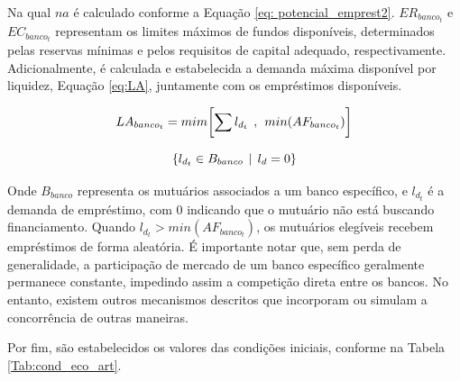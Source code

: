 \documentclass[hidelinks, article,12pt,oneside,a4paper,english,brazil,sumario=tradicional]{abntex2}
\begin{document}
Na qual $na$ é calculado conforme a Equação \ref{eq: potencial_emprest2}. $ER_{banco_{t}}$ e $EC_{banco_{t}}$ representam os limites máximos de fundos disponíveis, determinados pelas reservas mínimas e pelos requisitos de capital adequado, respectivamente. Adicionalmente, é calculada e estabelecida a demanda máxima disponível por liquidez, Equação \ref{eq:LA}, juntamente com os empréstimos disponíveis.

\begin{equation} \label{eq:LA}
 LA_{banco_{t}} = mim \biggl[ \sum l_{d_{t}} \hspace{1.5mm} , \hspace{1.5mm} min (AF_{banco_{t}})    \biggl]
\end{equation}

\begin{equation} \label{eq:LA2}
 \{ l_{d_{t}} \in B_{banco} \hspace{1.5mm} | \hspace{1.5mm} l_{d} = 0\}
\end{equation}

Onde $B_{banco}$ representa os mutuários associados a um banco específico, e $l_{d_{t}}$ é a demanda de empréstimo, com $0$ indicando que o mutuário não está buscando financiamento. Quando $l_{d_{t}} > min (AF_{banco_{t}})$, os mutuários elegíveis recebem empréstimos de forma aleatória. É importante notar que, sem perda de generalidade, a participação de mercado de um banco específico geralmente permanece constante, impedindo assim a competição direta entre os bancos. No entanto, existem outros mecanismos descritos que incorporam ou simulam a concorrência de outras maneiras.

Por fim, são estabelecidos os valores das condições iniciais, conforme na Tabela \ref{Tab:cond_eco_art}.
\end{document}
